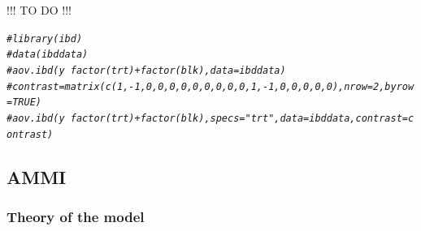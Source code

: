 \documentclass{book}\usepackage[]{graphicx}\usepackage[]{color}
\makeatletter
\newcommand{\hlcom}[1]{\textcolor[rgb]{0.678,0.584,0.686}{\textit{#1}}}%
\newenvironment{kframe}{%
 \def\at@end@of@kframe{}%
 \ifinner\ifhmode%
  \def\at@end@of@kframe{\end{minipage}}%
  \begin{minipage}{\columnwidth}%
 \fi\fi%
 \def\FrameCommand##1{\hskip\@totalleftmargin \hskip-\fboxsep
 \colorbox{shadecolor}{##1}\hskip-\fboxsep
     \hskip-\linewidth \hskip-\@totalleftmargin \hskip\columnwidth}%
 \MakeFramed {\advance\hsize-\width
   \@totalleftmargin\z@ \linewidth\hsize
   \@setminipage}}%
 {\par\unskip\endMakeFramed%
 \at@end@of@kframe}
\newenvironment{knitrout}{}{} %
\makeatother
\begin{document}
!!! TO DO !!!

\begin{knitrout}
\color{fgcolor}\begin{kframe}
\begin{alltt}
\hlcom{#library(ibd)}
\hlcom{#data(ibddata)}
\hlcom{#aov.ibd(y~factor(trt)+factor(blk),data=ibddata)}
\hlcom{#contrast=matrix(c(1,-1,0,0,0,0,0,0,0,0,0,1,-1,0,0,0,0,0),nrow=2,byrow=TRUE)}
\hlcom{#aov.ibd(y~factor(trt)+factor(blk),specs="trt",data=ibddata,contrast=contrast)}
\end{alltt}
\end{kframe}
\end{knitrout}
\newpage


\subsection{AMMI}
\label{ammi}

\subsubsection{Theory of the model}
\end{document}
